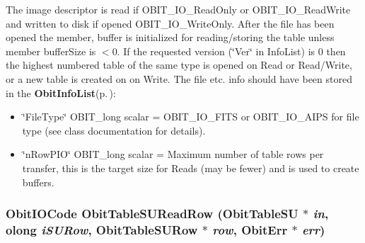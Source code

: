 The image descriptor is read if OBIT\_\-IO\_\-Read\-Only or OBIT\_\-IO\_\-Read\-Write and written to disk if opened OBIT\_\-IO\_\-Write\-Only. After the file has been opened the member, buffer is initialized for reading/storing the table unless member buffer\-Size is $<$0. If the requested version (\char`\"{}Ver\char`\"{} in Info\-List) is 0 then the highest numbered table of the same type is opened on Read or Read/Write, or a new table is created on on Write. The file etc. info should have been stored in the {\bf Obit\-Info\-List}{\rm (p.\,\pageref{structObitInfoList})}: \begin{itemize}
\item \char`\"{}File\-Type\char`\"{} OBIT\_\-long scalar = OBIT\_\-IO\_\-FITS or OBIT\_\-IO\_\-AIPS for file type (see class documentation for details). \item \char`\"{}n\-Row\-PIO\char`\"{} OBIT\_\-long scalar = Maximum number of table rows per transfer, this is the target size for Reads (may be fewer) and is used to create buffers. 
\end{itemize}
\subsubsection{\setlength{\rightskip}{0pt plus 5cm}Obit\-IOCode Obit\-Table\-SURead\-Row ({\bf Obit\-Table\-SU} $\ast$ {\em in}, {\bf olong} {\em i\-SURow}, {\bf Obit\-Table\-SURow} $\ast$ {\em row}, {\bf Obit\-Err} $\ast$ {\em err})}\label{ObitTableSU_8c_a22}


